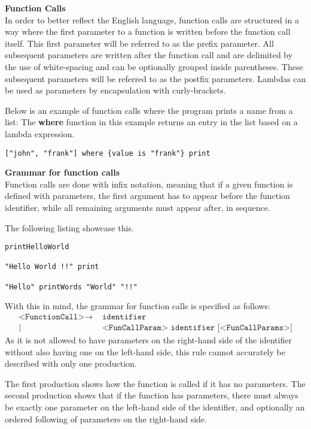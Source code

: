\textbf{Function Calls}\\
In order to better reflect the English language, function calls are structured in a way where the first parameter to a function is written before the function call itself.
This first parameter will be referred to as the prefix parameter. 
All subsequent parameters are written after the function call and are delimited by the use of white-spacing and can be optionally grouped inside parentheses.
These subsequent parameters will be referred to as the postfix parameters.
Lambdas can be used as parameters by encapsulation with curly-brackets. 

Below is an example of function calls where the program prints a name from a list:
The \textbf{where} function in this example returns an entry in the list based on a lambda expression.
\begin{lstlisting}[language=HCL,label=lis:hclPrintnFromList,firstnumber=1]
["john", "frank"] where {value is "frank"} print
\end{lstlisting}

\textbf{Grammar for function calls}\\
Function calls are done with infix notation, meaning that if a given function is defined with parameters, the first argument has to appear before the function identifier, while all remaining arguments must appear after, in sequence.

The following listing showcase this.
\begin{lstlisting}[language=HCL,caption={Function call notation in HCL.
printHelloWolrd, print and printWords are functions and have been declared before hand.
},firstnumber=1]
printHelloWorld

"Hello World !!" print

"Hello" printWords "World" "!!"
\end{lstlisting}

With this in mind, the grammar for function calls is specified as follows:
\begin{align*}
	\texttt{<FunctionCall>}\to & \texttt{ identifier}\\
	| & \texttt{ <FunCallParam> identifier [<FunCallParams>]}
\end{align*}
As it is not allowed to have parameters on the right-hand side of the identifier without also having one on the left-hand side, this rule cannot accurately be described with only one production.

The first production shows how the function is called if it has no parameters.
The second production shows that if the function has parameters, there must always be exactly one parameter on the left-hand side of the identifier, and optionally an ordered following of parameters on the right-hand side.

